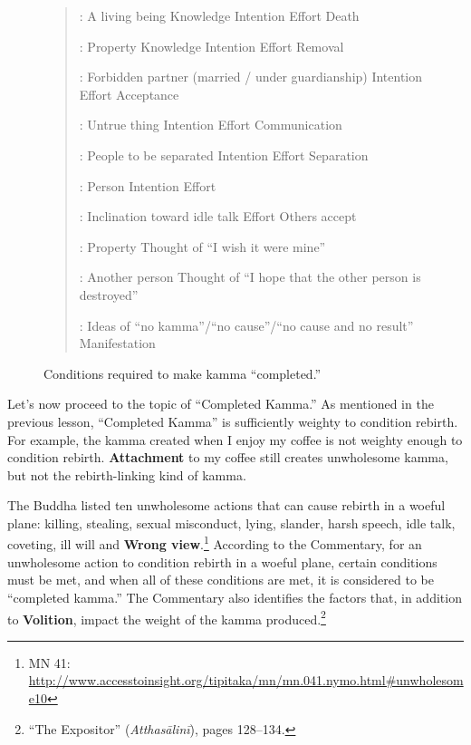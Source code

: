 \begin{figure}[H]

\begin{quote}

:  A living being  Knowledge  Intention  Effort  Death

:  Property  Knowledge  Intention  Effort  Removal

:  Forbidden partner (married / under guardianship)  Intention  Effort  Acceptance

:  Untrue thing  Intention  Effort  Communication

:  People to be separated  Intention  Effort  Separation

:  Person  Intention  Effort

:  Inclination toward idle talk  Effort  Others accept 

:  Property  Thought of “I wish it were mine”

:  Another person  Thought of “I hope that the other person is destroyed”

:  Ideas of “no kamma”/“no cause”/“no cause and no result”  Manifestation

\end{quote}

\caption{Conditions required to make kamma “completed.”}
\label{fig:Completed}
\end{figure}

Let’s now proceed to the topic of “Completed Kamma.” As mentioned in the previous lesson, “Completed Kamma” is sufficiently weighty to condition rebirth. For example, the kamma created when I enjoy my coffee is not weighty enough to condition rebirth. \textbf{Attachment} to my coffee still creates unwholesome kamma, but not the rebirth-linking kind of kamma.

The Buddha listed ten unwholesome actions that can cause rebirth in a woeful plane: killing, stealing, sexual misconduct, lying, slander, harsh speech, idle talk, coveting, ill will and \textbf{Wrong view}.\footnote{MN 41: \url{http://www.accesstoinsight.org/tipitaka/mn/mn.041.nymo.html\#unwholesome10}} According to the Commentary, for an unwholesome action to condition rebirth in a woeful plane, certain conditions must be met, and when all of these conditions are met, it is considered to be “completed kamma.” The Commentary also identifies the factors that, in addition to \textbf{Volition}, impact the weight of the kamma produced.\footnote{“The Expositor” (\textit{Atthasālinī}), pages 128--134.}

